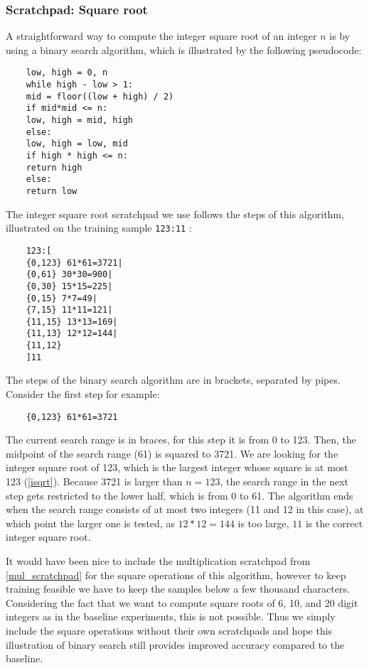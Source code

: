 \subsubsection{Scratchpad: Square root}
\label{sqrt_scratchpad}

A straightforward way to compute the integer square root of an integer $n$ is by using a binary search algorithm, which is illustrated by the following pseudocode:

\begin{lstlisting}
	low, high = 0, n
	while high - low > 1:
	mid = floor((low + high) / 2)
	if mid*mid <= n:
	low, high = mid, high
	else:
	low, high = low, mid 
	if high * high <= n:
	return high
	else:
	return low
\end{lstlisting}

\noindent
The integer square root scratchpad we use follows the steps of this algorithm, illustrated on the training sample \verb|123:11| :

\begin{lstlisting}
	123:[
	{0,123} 61*61=3721| 
	{0,61} 30*30=900|
	{0,30} 15*15=225|
	{0,15} 7*7=49|
	{7,15} 11*11=121|
	{11,15} 13*13=169|
	{11,13} 12*12=144|
	{11,12}
	]11
\end{lstlisting}

The steps of the binary search algorithm are in brackets, separated by pipes.
Consider the first step for example:

\begin{lstlisting}
	{0,123} 61*61=3721
\end{lstlisting}

The current search range is in braces, for this step it is from 0 to 123.
Then, the midpoint of the search range (61) is squared to 3721.
We are looking for the integer square root of 123, which is the largest integer whose square is at most 123 (\cref{isqrt}). Because 3721 is larger than $n=123$, the search range in the next step gets restricted to the lower half, which is from 0 to 61.
The algorithm ends when the search range consists of at most two integers (11 and 12 in this case), at which point the larger one is tested, as $12*12=144$ is too large, $11$ is the correct integer square root.


It would have been nice to include the multiplication scratchpad from \cref{mul_scratchpad} for the square operations of this algorithm, however to keep training feasible we have to keep the samples below a few thousand characters. Considering the fact that we want to compute square roots of 6, 10, and 20 digit integers as in the baseline experiments, this is not possible.
Thus we simply include the square operations without their own scratchpads and hope this illustration of binary search still provides improved accuracy compared to the baseline.





